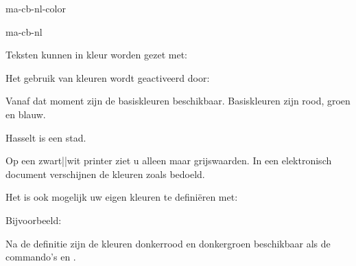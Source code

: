 \startonderdeel ma-cb-nl-color

\produkt ma-cb-nl




Teksten kunnen in kleur worden gezet met:


Het gebruik van kleuren wordt geactiveerd door:

\starttypen
\stelkleurenin[status=start]
\stoptypen

Vanaf dat moment zijn de basiskleuren beschikbaar.
Basiskleuren zijn rood, groen en blauw.

\startbuffer
\startkleur[rood]
Hasselt is een  stad.
\stopkleur
\stopbuffer

\typebuffer

\haalbuffer

Op een zwart||wit printer ziet u alleen maar grijswaarden.
In een elektronisch document verschijnen de kleuren zoals
bedoeld.

Het is ook mogelijk uw eigen kleuren te defini\"eren met:


Bijvoorbeeld:

\startbuffer
{}
\stopbuffer

\typebuffer

Na de definitie zijn de kleuren donkerrood en donkergroen
beschikbaar als de commando's \type{\donkerrood} en
\type{\donkergroen}.

\stoponderdeel
